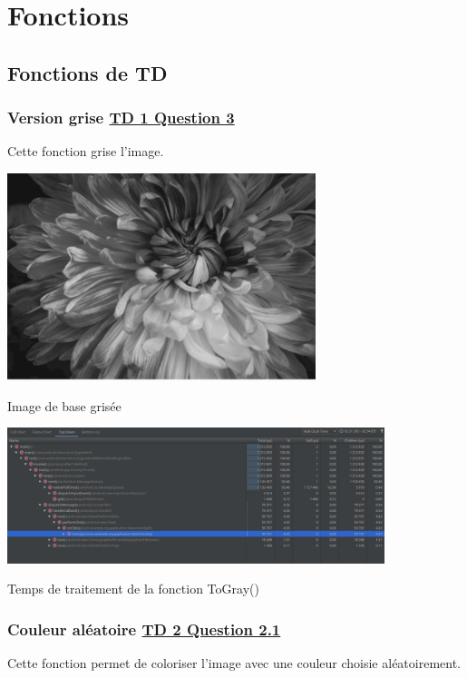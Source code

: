 \documentclass{article}
\begin{document}
\section{Fonctions}

\subsection{Fonctions de TD}

\subsubsection{Version grise \underline{TD 1 Question 3}}
Cette fonction grise l'image.
\bigbreak

\begin{center} 
    \includegraphics[width=9cm]{../Image_fonctions/Gris}

    Image de base grisée
\end{center}
\bigbreak

\begin{center} 
    \includegraphics[width=11cm]{../Image_temps/TempsToGray}

    Temps de traitement de la fonction ToGray()
\end{center}
\bigbreak

\subsubsection{Couleur aléatoire \underline{TD 2 Question 2.1}}
Cette fonction permet de coloriser l'image avec une couleur choisie aléatoirement.
\bigbreak
\end{document}
